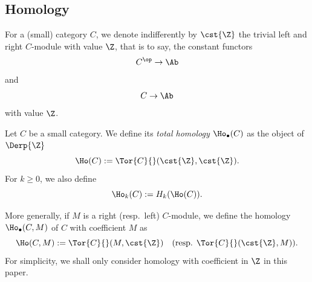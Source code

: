 \subsection{Homology}
\begin{paragr}
  For a (small) category $C$, we denote indifferently by $\cst{\Z}$
  the trivial left and right $C$-module with value $\Z$, that is to
  say, the constant functors
  \[
    C^{\op} \to \Ab
  \]
  and
  \[
    C \to \Ab
  \]
  with value $\Z$.
\end{paragr}
\begin{definition}\label{def:homtor}
  Let $C$ be a small category. We define its \emph{total homology
    $\Ho_{\bullet}(C)$} as the object of $\Derp{\Z}$
  \[
    \Ho(C):=\Tor{C}{}(\cst{\Z},\cst{\Z}).
  \]
  For $k \geq 0$, we also define
  \[
    \Ho_k(C):=H_k(\Ho(C)).
  \]
\end{definition}
\begin{remark}
  More generally, if $M$ is a right (resp.\ left) $C$\nbd-module, we
  define the homology $\Ho_{\bullet}(C,M)$ of $C$ with coefficient $M$ as 
  \[
    \Ho(C,M):=\Tor{C}{}(M,\cst{\Z}) \quad\text{(resp. }\Tor{C}{}(\cst{\Z},M)).
  \]
  For simplicity, we shall only consider homology with coefficient in
  $\Z$ in this paper.
\end{remark}
